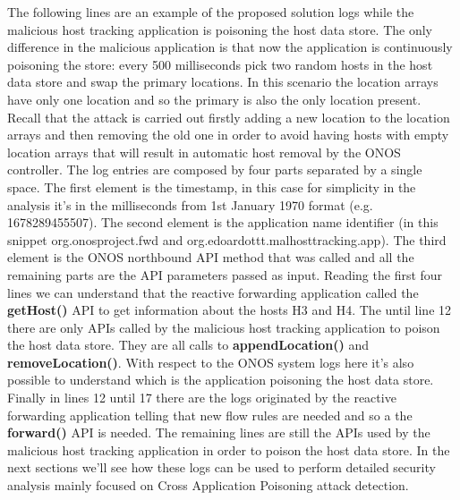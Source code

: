 The following lines are an example of the proposed solution logs while the malicious host tracking application is poisoning the host data store. The only difference in the malicious application is that now the application is continuously poisoning the store: every 500 milliseconds pick two random hosts in the host data store and swap the primary locations. In this scenario the location arrays have only one location and so the primary is also the only location present. Recall that the attack is carried out firstly adding a new location to the location arrays and then removing the old one in order to avoid having hosts with empty location arrays that will result in automatic host removal by the ONOS controller. The log entries are composed by four parts separated by a single space. The first element is the timestamp, in this case for simplicity in the analysis it's in the milliseconds from 1st January 1970 format (e.g. 1678289455507). The second element is the application name identifier (in this snippet org.onosproject.fwd and org.edoardottt.malhosttracking.app). The third element is the ONOS northbound API method that was called and all the remaining parts are the API parameters passed as input. Reading the first four lines we can understand that the reactive forwarding application called the \textbf{getHost()} API to get information about the hosts H3 and H4. The until line 12 there are only APIs called by the malicious host tracking application to poison the host data store. They are all calls to \textbf{appendLocation()} and \textbf{removeLocation()}. With respect to the ONOS system logs here it's also possible to understand which is the application poisoning the host data store. Finally in lines 12 until 17 there are the logs originated by the reactive forwarding application telling that new flow rules are needed and so a the \textbf{forward()} API is needed. The remaining lines are still the APIs used by the malicious host tracking application in order to poison the host data store. In the next sections we'll see how these logs can be used to perform detailed security analysis mainly focused on Cross Application Poisoning attack detection.
